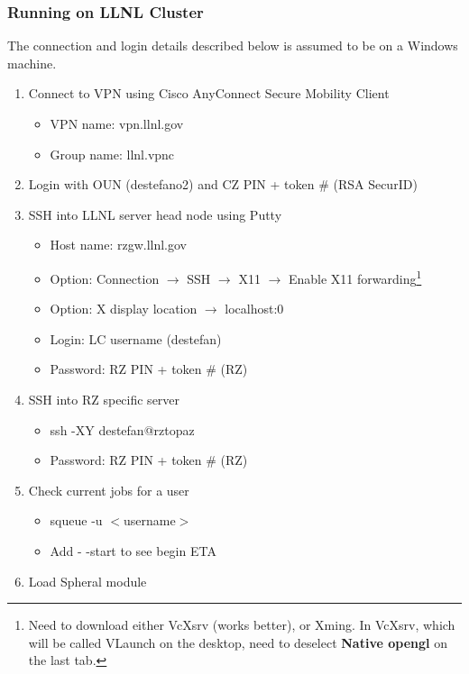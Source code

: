 \documentclass{hitec}
\numberwithin{equation}{section}
\begin{document}
\subsubsection{Running on LLNL Cluster}
The connection and login details described below is assumed to be on a \textsf{Windows} machine.

\begin{enumerate}
	\item Connect to VPN using \textsf{Cisco AnyConnect Secure Mobility Client}
	\begin{itemize}
		\item VPN name: \textsf{vpn.llnl.gov}
		\item Group name: \textsf{llnl.vpnc}
	\end{itemize}
	\item Login with \textsf{OUN} (\textsf{destefano2}) and \textsf{CZ PIN} + token \# (\textsf{RSA SecurID})
	\item SSH into LLNL server head node using \textsf{Putty}
	\begin{itemize}
		\item Host name: \textsf{rzgw.llnl.gov}
		\item Option: Connection $\rightarrow$ SSH $\rightarrow$ X11 $\rightarrow$ Enable X11 forwarding\footnote{Need to download either \textsf{VcXsrv} (works better), or \textsf{Xming}. In \textsf{VcXsrv}, which will be called \textsf{VLaunch} on the desktop, need to deselect \textbf{Native opengl} on the last tab.}
		\item Option: X display location $\rightarrow$ \textsf{localhost:0}
		\item Login: LC username (destefan)
		\item Password: RZ PIN + token \# (RZ)
	\end{itemize}
	\item SSH into RZ specific server
	\begin{itemize}
		\item \textsf{ssh -XY destefan@rztopaz}
		\item Password: RZ PIN + token \# (RZ)
	\end{itemize}
	\item Check current jobs for a user
	\begin{itemize}
		\item \textsf{squeue -u $<$username$>$}
		\item Add \textsf{- -start} to see begin ETA
	\end{itemize}
	\item Load Spheral module

\end{enumerate}
\end{document}
